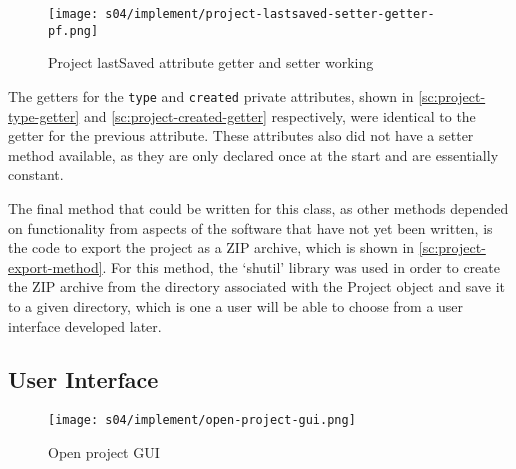         \begin{figure}[!ht]
            \centering
            \texttt{[image: s04/implement/project-lastsaved-setter-getter-pf.png]}
            \caption{Project lastSaved attribute getter and setter working}
            \label{fig:project-lastsaved-getter-setter-pf}
        \end{figure}

        The getters for the \verb|type| and \verb|created| private attributes, shown in \autoref{sc:project-type-getter} and \autoref{sc:project-created-getter} respectively, were identical to the getter for the previous attribute. 
        These attributes also did not have a setter method available, as they are only declared once at the start and are essentially constant. 


        The final method that could be written for this class, as other methods depended on functionality from aspects of the software that have not yet been written, is the code to export the project as a ZIP archive, which is shown in \autoref{sc:project-export-method}. 
        For this method, the `shutil' library was used in order to create the ZIP archive from the directory associated with the Project object and save it to a given directory, which is one a user will be able to choose from a user interface developed later.
        
    \subsection{User Interface}


        \begin{figure}[!ht]
            \centering
            \texttt{[image: s04/implement/open-project-gui.png]}
            \caption{Open project GUI}
            \label{fig:open-project-gui}
        \end{figure}

